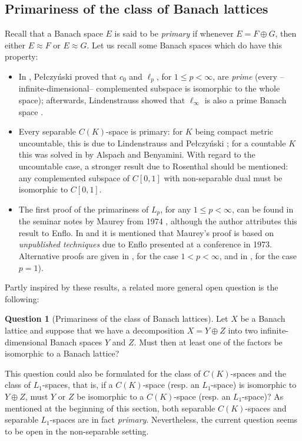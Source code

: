 \documentclass[11pt]{amsart}
\theoremstyle{definition}
\newtheorem{question}{Question}
\numberwithin{equation}{section}
\begin{document}
\subsection{Primariness of the class of Banach lattices} Recall that a Banach space $E$ is said to be \emph{primary} if whenever $E=F\oplus G$, then either $E\approx F$ or $E\approx G$. Let us recall some Banach spaces which do have this property:
\begin{itemize}
    \item In \cite{P60}, Pe\l{}czy\'{n}ski proved that $c_0$ and $\ell_p$, for $1\leq p<\infty$, are \textit{prime} (every --infinite-dimensional-- complemented subspace is isomorphic to the whole space); afterwards, Lindenstrauss showed that $\ell_\infty$ is also a prime Banach space \cite{Li67}.
    \item Every separable $C(K)$-space is primary: for $K$ being compact metric uncountable, this is due to Lindenstrauss and Pe\l{}czy\'{n}ski \cite[Corollary 1 to Theorem 2.1]{LP71}; for a countable $K$ this was solved in \cite{AB77} by Alspach and Benyamini. With regard to the uncountable case, a stronger result due to Rosenthal \cite{Rosenthal} should be mentioned: any complemented subspace of $C[0,1]$ with non-separable dual must be isomorphic to $C[0,1]$.
    \item The first proof of the primariness of $L_p$, for any $1\leq p <\infty$, can be found in the seminar notes by Maurey from 1974 \cite{M74-75}, although the author attributes this result to Enflo. In \cite{AEO77} and \cite{ES79} it is mentioned that Maurey's proof is based on \textit{unpublished techniques} due to Enflo presented at a conference in 1973. Alternative proofs are given in \cite[Theorem 1.3]{AEO77}, for the case $1<p<\infty$, and in \cite[Corollary 5.4]{ES79}, for the case $p=1$).
\end{itemize}
Partly inspired by these results, a related more general open question is the following:

\begin{question}[Primariness of the class of Banach lattices]\label{question:primariness-BLs}
Let $X$ be a Banach lattice and suppose that we have a decomposition $X=Y\oplus Z$ into two infinite-dimensional Banach spaces $Y$ and $Z$. Must then at least one of the factors be isomorphic to a Banach lattice?  
\end{question}

This question could also be formulated for the class of $C(K)$-spaces and the class of $L_1$-spaces, that is, if a $C(K)$-space (resp. an $L_1$-space) is isomorphic to $Y\oplus Z$, must $Y$ or $Z$ be isomorphic to a $C(K)$-space (resp. an $L_1$-space)? As mentioned at the beginning of this section, both separable $C(K)$-spaces and separable $L_1$-spaces are in fact \textit{primary}. Nevertheless, the current question seems to be open in the non-separable setting. %
\end{document}
